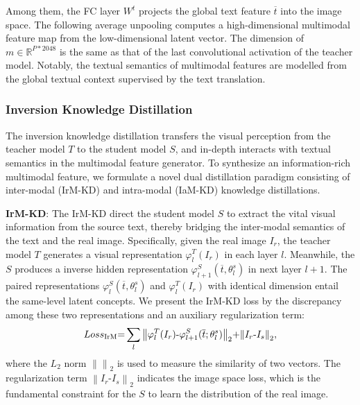 \documentclass[11pt]{article}
\begin{document}
Among them, the FC layer ${W}^{t}$ projects the global text feature $\overline{t}$ into the image space.
The following average unpooling computes a high-dimensional multimodal feature map from the low-dimensional latent vector.
The dimension of $m\in{{\mathbb{R}}^{P*2048}}$ is the same as that of the last convolutional activation of the teacher model.
Notably, the textual semantics of multimodal features are modelled from the global textual context supervised by the text translation.

\subsubsection{Inversion Knowledge Distillation}
The inversion knowledge distillation transfers the visual perception from the teacher model $T$ to the student model $S$, and in-depth interacts with textual semantics in the multimodal feature generator.
To synthesize an information-rich multimodal feature, we formulate a novel dual distillation paradigm consisting of inter-modal (IrM-KD) and intra-modal (IaM-KD) knowledge distillations.


\textbf{IrM-KD}:
The IrM-KD direct the student model $S$ to extract the vital visual information from the source text, thereby bridging the inter-modal semantics of the text and the real image.
Specifically, given the real image ${I}_{r}$, the teacher model $T$ generates a visual representation $\varphi _{l}^{T}({{I}_{r}})$ in each layer $l$.
Meanwhile, the $S$ produces a inverse hidden representation $\varphi _{l+1}^{S}\left( \overline{t},\theta _{l}^{s} \right)$ in next layer $l+1$.
The paired representations $\varphi _{l}^{S}\left( \overline{t},\theta _{l}^{s} \right)$ and $\varphi _{l}^{T}({{I}_{r}})$ with identical dimension entail the same-level latent concepts.
We present the IrM-KD loss by the discrepancy among these two representations and an auxiliary regularization term:
\begin{eqnarray}
Los{{s}_\text{IrM}}\text{=}\sum\limits_{l}{{{\left\| \varphi _{l}^{T}\text( {{I}_{r}} \text)\text{-}\varphi _{l+1}^{S}\text( \overline{t};\theta _{l}^{s} \text) \right\|}_{2}}}\text{+}{{\left\| {{I}_{r}}\text{-}{{I}_{s}} \right\|}_{2}},\label{eq:7}
\end{eqnarray}
where the $L_{2}$ norm ${{\left\| \right\|}_{2}}$ is used to measure the similarity of two vectors. The regularization term ${{\left\| {{I}_{r}}\text{-}{{I}_{s}} \right\|}_{2}}$ indicates the image space loss, which is the fundamental constraint for the $S$ to learn the distribution of the real image.
\end{document}
